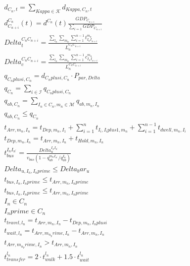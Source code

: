 \begin{align}
  & d_{C_n,t} = \sum_{Kappa \in \mathcal{K}} d_{Kappa,C_n,t} \tag{eq\_0004} \\
  & d_{C_{n + i}}^{C_{n}} \left(t\right) = d^{C_{n}} \left(t\right) \frac{\mathit{GDP}_{C_{n + i}}}{\sum_{i = 1} \mathit{GDP}_{C_{n + i}}} \tag{eq\_0005} \\
  & \mathit{Delta}_{t}^{C_{n} C_{n + i}} = \frac{\sum_{l_{n}} \sum_{m_{n}} \sum_{i = 1}^{n - 1} t_{I_{n} I_{n + i}}^{m_{n}}}{L_{n}^{C_{n} C_{n + i}}} \tag{eq\_0006} \\
  & \mathit{Delta}_{c}^{C_{n} C_{n + i}} = \frac{\sum_{l_{n}} \sum_{m_{n}} \sum_{i = 1}^{n - 1} c_{I_{n} I_{n + i}}^{m_{n}}}{L_{n}^{C_{n} C_{n + i}}} \tag{eq\_0007} \\
  & q_{C_nplusi,C_n} = d_{C_nplusi,C_n} \cdot P_{par,Delta} \tag{eq\_0010} \\
  & q_{C_n} = \sum_{i \in \mathcal{I}} q_{C_nplusi,C_n} \tag{eq\_0011} \\
  & q_{ab,C_n} = \sum_{I_n \in C_n, m_n \in \mathcal{M}} q_{ab,m_n,I_n} \tag{eq\_0012\_a} \\
  & q_{ab,C_n} \leq q_{C_n} \tag{eq\_0012\_b} \\
  & t_{Arr,m_n,I_n} = t_{Dep,m_n,I_1} + \sum_{i = 1}^{n} t_{I_i,I_iplus1,m_n} + \sum_{i = 1}^{n - 1} t_{dwell,m_n,I_i} \tag{eq\_0014} \\
  & t_{Dep,m_n,I_n} = t_{Arr,m_n,I_n} + t_{Hold,m_n,I_n} \tag{eq\_0015} \\
  & t_{b u s}^{I_{n} I_{n ^{'}}} = \frac{\mathit{Delta}_{u}^{I_{n} I_{n ^{'}}}}{v_{b u s} \left(1 - q_{a b}^{m_{n} I_{n ^{'}}} / q_{a b}^{I_{n}} \right)} \tag{eq\_0017\_a} \\
  & \mathit{Delta}_{u,I_n,I_nprime} \leq Delta_bar_u \tag{eq\_0017\_b} \\
  & t_{bus,I_n,I_nprime} \leq t_{Arr,m_n,I_nprime} \tag{eq\_0017\_c} \\
  & t_{bus,I_n,I_nprime} \leq t_{Arr,m_n,I_nprime} \tag{eq\_0017\_d} \\
  & I_n \in C_n \tag{eq\_0017\_e} \\
  & I_nprime \in C_n \tag{eq\_0017\_f} \\
  & t_{travel,l_n} = t_{Arr,m_n,I_n} - t_{Dep,m_n,I_nplusi} \tag{eq\_0018} \\
  & t_{wait,l_n} = t_{Arr,m_n_prime,I_n} - t_{Arr,m_n,I_n} \tag{eq\_0021\_a} \\
  & t_{Arr,m_n_prime,I_n} > t_{Arr,m_n,I_n} \tag{eq\_0021\_b} \\
  & t_{t r a n s f e r}^{l_{n}} = 2 \cdot t_{w a l k}^{l_{n}} + 1.5 \cdot t_{w a i t}^{l_{n}} \tag{eq\_0022} \\

\end{align}
